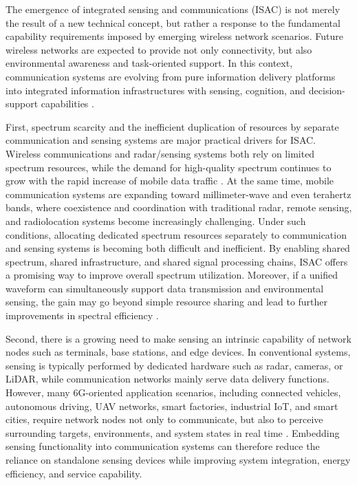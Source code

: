 The emergence of integrated sensing and communications (ISAC) is not merely the result of a new technical concept, but rather a response to the fundamental capability requirements imposed by emerging wireless network scenarios. Future wireless networks are expected to provide not only connectivity, but also environmental awareness and task-oriented support. In this context, communication systems are evolving from pure information delivery platforms into integrated information infrastructures with sensing, cognition, and decision-support capabilities \cite{Liu2022ISAC}.

First, spectrum scarcity and the inefficient duplication of resources by separate communication and sensing systems are major practical drivers for ISAC. Wireless communications and radar/sensing systems both rely on limited spectrum resources, while the demand for high-quality spectrum continues to grow with the rapid increase of mobile data traffic \cite{ITU_R_RR2024,miit_radio_freq_2026_en}. At the same time, mobile communication systems are expanding toward millimeter-wave and even terahertz bands, where coexistence and coordination with traditional radar, remote sensing, and radiolocation systems become increasingly challenging. Under such conditions, allocating dedicated spectrum resources separately to communication and sensing systems is becoming both difficult and inefficient. By enabling shared spectrum, shared infrastructure, and shared signal processing chains, ISAC offers a promising way to improve overall spectrum utilization. Moreover, if a unified waveform can simultaneously support data transmission and environmental sensing, the gain may go beyond simple resource sharing and lead to further improvements in spectral efficiency \cite{Liu2022ISAC,Hassanien2015dual}.

Second, there is a growing need to make sensing an intrinsic capability of network nodes such as terminals, base stations, and edge devices. In conventional systems, sensing is typically performed by dedicated hardware such as radar, cameras, or LiDAR, while communication networks mainly serve data delivery functions. However, many 6G-oriented application scenarios, including connected vehicles, autonomous driving, UAV networks, smart factories, industrial IoT, and smart cities, require network nodes not only to communicate, but also to perceive surrounding targets, environments, and system states in real time \cite{Zhang2021ISAC6G}. Embedding sensing functionality into communication systems can therefore reduce the reliance on standalone sensing devices while improving system integration, energy efficiency, and service capability.

